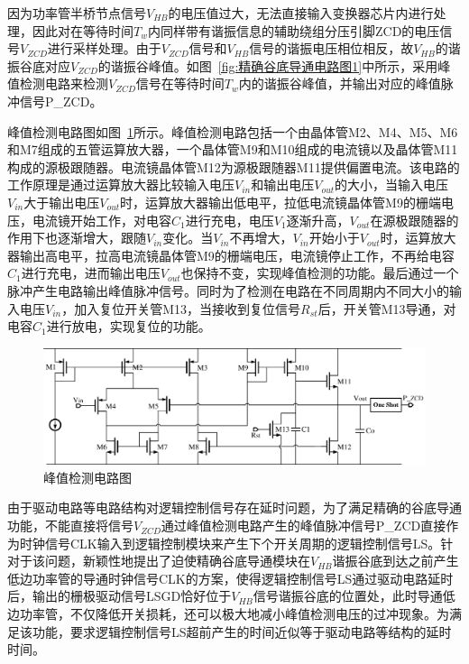 因为功率管半桥节点信号$V_{HB}$的电压值过大，无法直接输入变换器芯片内进行处理，因此对在等待时间$T_w$内同样带有谐振信息的辅助绕组分压引脚ZCD的电压信号$V_{ZCD}$进行采样处理。由于$V_{ZCD}$信号和$V_{HB}$信号的谐振电压相位相反，故$V_{HB}$的谐振谷底对应$V_{ZCD}$的谐振谷峰值。如图~\ref{fig:精确谷底导通电路图1}中所示，采用峰值检测电路来检测$V_{ZCD}$信号在等待时间$T_w$内的谐振谷峰值，并输出对应的峰值脉冲信号P\_ZCD。

峰值检测电路图如图~\ref{fig:峰值检测电路图}所示。峰值检测电路包括一个由晶体管M2、M4、M5、M6和M7组成的五管运算放大器，一个晶体管M9和M10组成的电流镜以及晶体管M11构成的源极跟随器。电流镜晶体管M12为源极跟随器M11提供偏置电流。该电路的工作原理是通过运算放大器比较输入电压$V_{in}$和输出电压$V_{out}$的大小，当输入电压$V_{in}$大于输出电压$V_{out}$时，运算放大器输出低电平，拉低电流镜晶体管M9的栅端电压，电流镜开始工作，对电容$C_1$进行充电，电压$V_1$逐渐升高，$V_{out}$在源极跟随器的作用下也逐渐增大，跟随$V_{in}$变化。当$V_{in}$不再增大，$V_{in}$开始小于$V_{out}$时，运算放大器输出高电平，拉高电流镜晶体管M9的栅端电压，电流镜停止工作，不再给电容$C_1$进行充电，进而输出电压$V_{out}$也保持不变，实现峰值检测的功能。最后通过一个脉冲产生电路输出峰值脉冲信号。同时为了检测在电路在不同周期内不同大小的输入电压$V_{in}$，加入复位开关管M13，当接收到复位信号$R_{st}$后，开关管M13导通，对电容$C_1$进行放电，实现复位的功能。

\begin{figure}[htbp] 
    \centering
    \includegraphics[width=1.0\linewidth]{figures/峰值检测电路图.pdf}
    \caption{峰值检测电路图}
    \label{fig:峰值检测电路图}
\end{figure}

由于驱动电路等电路结构对逻辑控制信号存在延时问题，为了满足精确的谷底导通功能，不能直接将信号$V_{ZCD}$通过峰值检测电路产生的峰值脉冲信号P\_ZCD直接作为时钟信号CLK输入到逻辑控制模块来产生下个开关周期的逻辑控制信号LS。针对于该问题，新颖性地提出了迫使精确谷底导通模块在$V_{HB}$谐振谷底到达之前产生低边功率管的导通时钟信号CLK的方案，使得逻辑控制信号LS通过驱动电路延时后，输出的栅极驱动信号LSGD恰好位于$V_{HB}$信号谐振谷底的位置处，此时导通低边功率管，不仅降低开关损耗，还可以极大地减小峰值检测电压的过冲现象。为满足该功能，要求逻辑控制信号LS超前产生的时间近似等于驱动电路等结构的延时时间。

